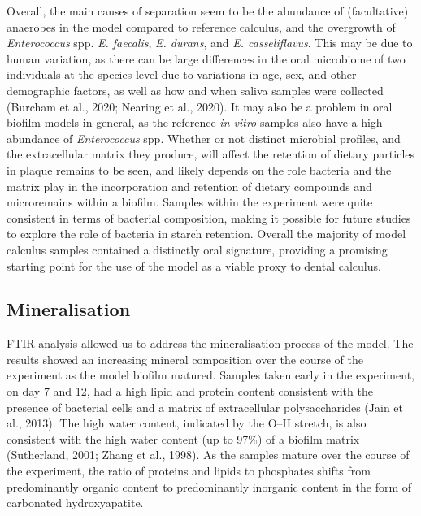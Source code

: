 \documentclass[
]{article}
\begin{document}
Overall, the main causes of separation seem to be the abundance of
(facultative) anaerobes in the model compared to reference calculus, and
the overgrowth of \emph{Enterococcus} spp. \emph{E. faecalis}, \emph{E.
durans}, and \emph{E. casseliflavus}. This may be due to human
variation, as there can be large differences in the oral microbiome of
two individuals at the species level due to variations in age, sex, and
other demographic factors, as well as how and when saliva samples were
collected (Burcham et al., 2020; Nearing et al., 2020). It may also be a
problem in oral biofilm models in general, as the reference \emph{in
vitro} samples also have a high abundance of \emph{Enterococcus} spp.
Whether or not distinct microbial profiles, and the extracellular matrix
they produce, will affect the retention of dietary particles in plaque
remains to be seen, and likely depends on the role bacteria and the
matrix play in the incorporation and retention of dietary compounds and
microremains within a biofilm. Samples within the experiment were quite
consistent in terms of bacterial composition, making it possible for
future studies to explore the role of bacteria in starch retention.
Overall the majority of model calculus samples contained a distinctly
oral signature, providing a promising starting point for the use of the
model as a viable proxy to dental calculus.

\hypertarget{mineralisation}{%
\subsection{Mineralisation}\label{mineralisation}}

FTIR analysis allowed us to address the mineralisation process of the
model. The results showed an increasing mineral composition over the
course of the experiment as the model biofilm matured. Samples taken
early in the experiment, on day 7 and 12, had a high lipid and protein
content consistent with the presence of bacterial cells and a matrix of
extracellular polysaccharides (Jain et al., 2013). The high water
content, indicated by the O--H stretch, is also consistent with the high
water content (up to 97\%) of a biofilm matrix (Sutherland, 2001; Zhang
et al., 1998). As the samples mature over the course of the experiment,
the ratio of proteins and lipids to phosphates shifts from predominantly
organic content to predominantly inorganic content in the form of
carbonated hydroxyapatite.
\end{document}
